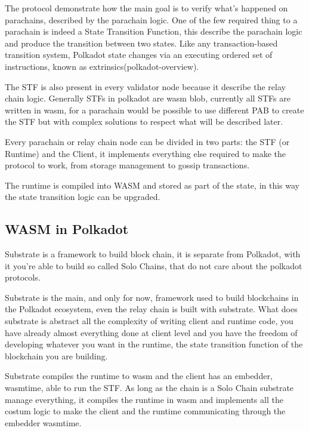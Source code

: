 \documentclass[../main.tex]{subfiles}
\begin{document}
The protocol demonstrate how the main goal is to verify what's happened on parachains, described by the parachain logic. One of the few required thing to a parachain is indeed a State Transition Function, this describe the parachain logic and produce the transition between two states. Like any transaction-based transition system, Polkadot state changes via an executing ordered set of instructions, known as extrinsics(polkadot-overview).

The STF is also present in every validator node because it describe the relay chain logic. Generally STFs in polkadot are wasm blob, currently all STFs are written in wasm, for a parachain would be possible to use different PAB to create the STF but with complex solutions to respect what will be described later.

Every parachain or relay chain node can be divided in two parts: the STF (or Runtime) and the Client, it implements everything else required to make the protocol to work, from storage management to gossip transactions.

The runtime is compiled into WASM and stored as part of the state, in this way the state transition logic can be upgraded.


\subsection{WASM in Polkadot}

Substrate is a framework to build block chain, it is separate from Polkadot, with it you're able to build so called Solo Chains, that do not care about the polkadot protocols.

Substrate is the main, and only for now, framework used to build blockchains in the Polkadot ecosystem, even the relay chain is built with substrate. What does substrate is abstract all the complexity of writing client and runtime code, you have already almost everything done at client level and you have the freedom of developing whatever you want in the runtime, the state transition function of the blockchain you are building.

Substrate compiles the runtime to wasm and the client has an embedder, wasmtime, able to run the STF. As long as the chain is a Solo Chain substrate manage everything, it compiles the runtime in wasm and implements all the costum logic to make the client and the runtime communicating through the embedder wasmtime.
\end{document}
